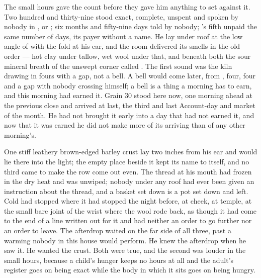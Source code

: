 
The small hours gave  the count before they gave him anything to set against it. Two hundred and thirty-nine stood exact, complete, unspent and spoken by nobody in ,  or ; six months and fifty-nine days told by nobody; 's fifth unpaid the same number of days, its payer without a name. He lay under  roof at the low angle of  with the fold at his ear, and the room delivered its smells in the old order --- hot clay under tallow, wet wool under that, and beneath both the sour mineral breath of the unswept corner  called . The first sound was the kiln drawing in fours with a gap, not a bell. A bell would come later, from , four, four and a gap with nobody crossing himself; a bell is a thing a morning has to earn, and this morning had earned it. Grain 30 stood here now, one morning ahead at the previous close and arrived at last, the third and last Account-day and market of the month. He had not brought it early into a day that had not earned it, and now that it was earned he did not make more of its arriving than of any other morning's.

One stiff leathery brown-edged barley crust lay two inches from his ear and would lie there into the light; the empty place beside it kept its name to itself, and no third came to make the row come out even. The thread at his mouth had frozen in the dry heat and was unwiped; nobody under any roof had ever been given an instruction about the thread, and a basket set down is a pot set down and left. Cold had stopped where it had stopped the night before, at cheek, at temple, at the small bare joint of the wrist where the wool rode back, as though it had come to the end of a line written out for it and had neither an order to go further nor an order to leave. The afterdrop waited on the far side of all three, past a warming nobody in this house would perform. He knew the afterdrop when he saw it. He wanted the crust. Both were true, and the second was louder in the small hours, because a child's hunger keeps no hours at all and the adult's register goes on being exact while the body in which it sits goes on being hungry.

